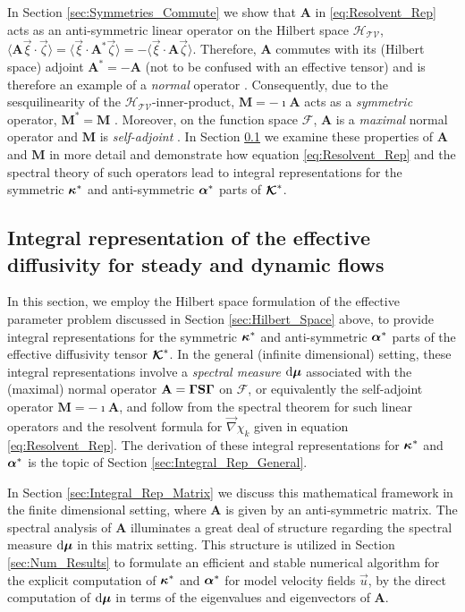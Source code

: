\documentclass[11pt]{amsart}
\renewcommand{\d}{\mathrm{d}}
\newcommand{\Mb}{\mathbf{M}}
\newcommand{\Sb}{\mathbf{S}}
\newcommand{\Ab}{\mathbf{A}}
\newcommand\Kbc{\mbox{\boldmath${\mathcal{K}}$}}
\newcommand{\Tc}{\mathcal{T}}
\newcommand{\Vc}{\mathcal{V}}
\newcommand{\Hs}{\mathscr{H}}
\newcommand{\Fs}{\mathscr{F}}
\newcommand\bmu{\mbox{\boldmath${\mu}$}}
\newcommand\balpha{\mbox{\boldmath${\alpha}$}}
\newcommand\bkappa{\mbox{\boldmath${\kappa}$}}
\newcommand\bGamma{\mbox{\boldmath${\Gamma}$}}
\begin{document}
In Section \ref{sec:Symmetries_Commute} we show that $\Ab$ in
\eqref{eq:Resolvent_Rep} acts as an anti-symmetric linear operator on
the Hilbert space $\Hs_{\Tc\Vc}$,
$\langle\Ab\vec{\xi}\cdot\vec{\zeta}\rangle=\langle\vec{\xi}\cdot\Ab^*\vec{\zeta}\rangle=-\langle\vec{\xi}\cdot\Ab\vec{\zeta}\rangle$. Therefore,
$\Ab$ commutes with its (Hilbert space) adjoint $\Ab^*=-\Ab$ (not to
be confused with an effective tensor) and is therefore an example of a
\emph{normal} operator \cite{Stone:64}. Consequently, due to the
sesquilinearity of the $\Hs_{\Tc\Vc}$-inner-product, $\Mb=-\imath\Ab$ acts
as a \emph{symmetric} operator, $\Mb^*=\Mb$
\cite{Reed-1980,Stone:64}. Moreover, on the function space $\Fs$,
$\Ab$ is a \emph{maximal} normal operator and $\Mb$ is
\emph{self-adjoint} \cite{Stone:64}. In Section \ref{sec:Integral_Rep}
we examine these properties of $\Ab$ and $\Mb$ in more detail and
demonstrate how equation \eqref{eq:Resolvent_Rep} and the spectral
theory of such operators lead to integral representations for the
symmetric $\bkappa^*$ and anti-symmetric $\balpha^*$ parts of $\Kbc^*$.      








\subsection{Integral representation of the effective diffusivity
  for steady and dynamic flows}\label{sec:Integral_Rep}
%
In this section, we employ the Hilbert space formulation of the
effective parameter problem discussed in Section
\ref{sec:Hilbert_Space} above, to provide integral representations for the
symmetric $\bkappa^*$ and anti-symmetric $\balpha^*$ parts of the
effective diffusivity tensor $\Kbc^*$. In the general (infinite
dimensional) setting, these integral representations involve a
\emph{spectral measure} $\d\bmu$ associated with the (maximal) normal
operator $\Ab=\bGamma\Sb\bGamma$ on $\Fs$, or equivalently the
self-adjoint operator $\Mb=-\imath\Ab$, and follow from the spectral
theorem for such linear operators \cite{Reed-1980,Stone:64} and the resolvent
formula for $\vec{\nabla}\chi_k$ given in equation
\eqref{eq:Resolvent_Rep}. The derivation of these integral
representations for $\bkappa^*$ and $\balpha^*$ is the topic of
Section \ref{sec:Integral_Rep_General}.




In Section \ref{sec:Integral_Rep_Matrix} we discuss this mathematical
framework in the finite dimensional setting, where $\Ab$ is given by
an anti-symmetric matrix. The spectral analysis of $\Ab$ illuminates a
great deal of structure regarding the spectral measure $\d\bmu$ in
this matrix setting. This structure is utilized in Section
\ref{sec:Num_Results} to formulate an efficient and stable numerical
algorithm for the explicit computation of $\bkappa^*$ and $\balpha^*$
for model velocity fields $\vec{u}$, by the direct computation of
$\d\bmu$ in terms of the eigenvalues and eigenvectors of $\Ab$.   
\end{document}
